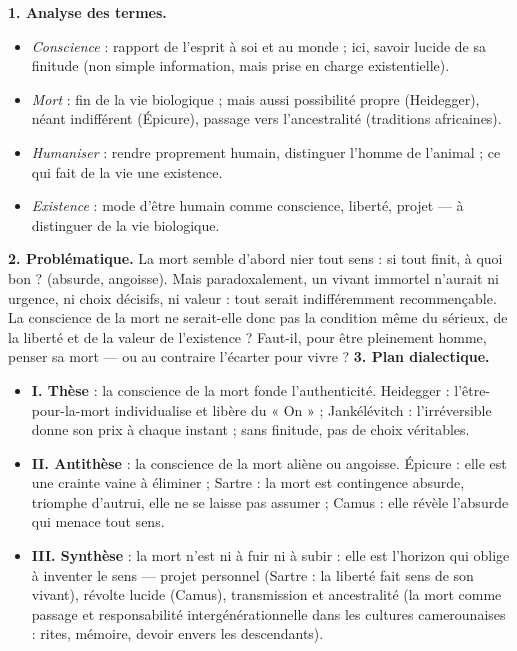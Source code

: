 \documentclass[11pt]{article}
\begin{document}
\begin{corrige}
\textbf{1. Analyse des termes.}
\begin{itemize}
\item \emph{Conscience} : rapport de l'esprit à soi et au monde ; ici, savoir lucide de sa finitude (non simple information, mais prise en charge existentielle).
\item \emph{Mort} : fin de la vie biologique ; mais aussi possibilité propre (Heidegger), néant indifférent (Épicure), passage vers l'ancestralité (traditions africaines).
\item \emph{Humaniser} : rendre proprement humain, distinguer l'homme de l'animal ; ce qui fait de la vie une existence.
\item \emph{Existence} : mode d'être humain comme conscience, liberté, projet — à distinguer de la vie biologique.
\end{itemize}
\textbf{2. Problématique.} La mort semble d'abord nier tout sens : si tout finit, à quoi bon ? (absurde, angoisse). Mais paradoxalement, un vivant immortel n'aurait ni urgence, ni choix décisifs, ni valeur : tout serait indifféremment recommençable. La conscience de la mort ne serait-elle donc pas la condition même du sérieux, de la liberté et de la valeur de l'existence ? Faut-il, pour être pleinement homme, penser sa mort — ou au contraire l'écarter pour vivre ?
\textbf{3. Plan dialectique.}
\begin{itemize}
\item \textbf{I. Thèse} : la conscience de la mort fonde l'authenticité. Heidegger : l'être-pour-la-mort individualise et libère du « On » ; Jankélévitch : l'irréversible donne son prix à chaque instant ; sans finitude, pas de choix véritables.
\item \textbf{II. Antithèse} : la conscience de la mort aliène ou angoisse. Épicure : elle est une crainte vaine à éliminer ; Sartre : la mort est contingence absurde, triomphe d'autrui, elle ne se laisse pas assumer ; Camus : elle révèle l'absurde qui menace tout sens.
\item \textbf{III. Synthèse} : la mort n'est ni à fuir ni à subir : elle est l'horizon qui oblige à inventer le sens — projet personnel (Sartre : la liberté fait sens de son vivant), révolte lucide (Camus), transmission et ancestralité (la mort comme passage et responsabilité intergénérationnelle dans les cultures camerounaises : rites, mémoire, devoir envers les descendants).

\end{itemize}
\end{corrige}
\end{document}
